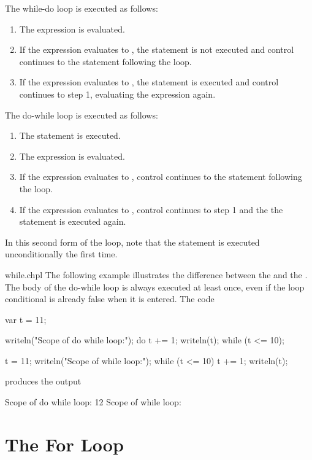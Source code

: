 The while-do loop is executed as follows:
\begin{enumerate}
\item The expression is evaluated.
\item If the expression evaluates to , the statement is
  not executed and control continues to the statement following the
  loop.
\item If the expression evaluates to , the statement is
  executed and control continues to step 1, evaluating the expression
  again.
\end{enumerate}

The do-while loop is executed as follows:
\begin{enumerate}
\item The statement is executed.
\item The expression is evaluated.
\item If the expression evaluates to , control continues
  to the statement following the loop.
\item If the expression evaluates to , control continues to
  step 1 and the the statement is executed again.
\end{enumerate}
In this second form of the loop, note that the statement is executed
unconditionally the first time.

\begin{chapelexample}{while.chpl}
The following example illustrates the difference between
the  and the .  The body of
the do-while loop is always executed at least once, even if the loop conditional
is already false when it is entered.  The code
\begin{chapel}
var t = 11;

writeln("Scope of do while loop:");
do {
  t += 1;
  writeln(t);
} while (t <= 10);

t = 11;
writeln("Scope of while loop:");
while (t <= 10) {
  t += 1;
  writeln(t);
}
\end{chapel}
produces the output
\begin{chapelprintoutput}{}
Scope of do while loop:
12
Scope of while loop:
\end{chapelprintoutput}
\end{chapelexample}

\section{The For Loop}
\label{The_For_Loop}

